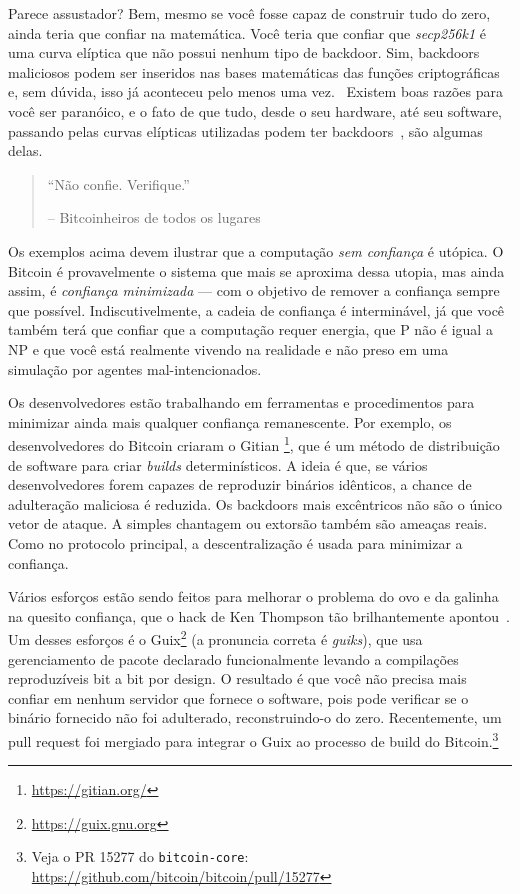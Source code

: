 Parece assustador? Bem, mesmo se você fosse capaz de construir tudo do zero, ainda teria que confiar na matemática. Você teria que confiar que \textit{secp256k1} é uma curva elíptica que não possui nenhum tipo de backdoor. Sim, backdoors maliciosos podem ser inseridos nas bases matemáticas das funções criptográficas e, sem dúvida, isso já aconteceu pelo menos uma vez.~\cite{wiki:Dual_EC_DRBG} Existem boas razões para você ser paranóico, e o fato de que tudo, desde o seu hardware, até seu software, passando pelas curvas elípticas utilizadas podem ter backdoors~\cite{wiki:backdoors}, são algumas delas.

\begin{quotation}\begin{samepage}
\enquote{Não confie. Verifique.}
\begin{flushright} -- Bitcoinheiros de todos os lugares
\end{flushright}\end{samepage}\end{quotation}

Os exemplos acima devem ilustrar que a computação \textit{sem confiança} é utópica. O Bitcoin é provavelmente o sistema que mais se aproxima dessa utopia, mas ainda assim, é \textit{confiança minimizada} --- com o objetivo de remover a confiança sempre que possível. Indiscutivelmente, a cadeia de confiança é interminável, já que você também terá que confiar que a computação requer energia, que P não é igual a NP e que você está realmente vivendo na realidade e não preso em uma simulação por agentes mal-intencionados.

Os desenvolvedores estão trabalhando em ferramentas e procedimentos para minimizar ainda mais qualquer confiança remanescente. Por exemplo, os desenvolvedores do Bitcoin criaram o Gitian \footnote{\url{https://gitian.org/}}, que é um método de distribuição de software para criar \textit{builds} determinísticos. A ideia é que, se vários desenvolvedores forem capazes de reproduzir binários idênticos, a chance de adulteração maliciosa é reduzida. Os backdoors mais excêntricos não são o único vetor de ataque. A simples chantagem ou extorsão também são ameaças reais. Como no protocolo principal, a descentralização é usada para minimizar a confiança.

Vários esforços estão sendo feitos para melhorar o problema do ovo e da galinha na quesito confiança, que o hack de Ken Thompson tão brilhantemente apontou~\cite{web:bootstrapping}. Um desses esforços é o Guix\footnote{\url{https://guix.gnu.org}} (a pronuncia correta é \textit{guiks}), que usa gerenciamento de pacote declarado funcionalmente levando a compilações reproduzíveis bit a bit por design. O resultado é que você não precisa mais confiar em nenhum servidor que fornece o software, pois pode verificar se o binário fornecido não foi adulterado, reconstruindo-o do zero. Recentemente, um pull request foi mergiado para integrar o Guix ao processo de build do Bitcoin.\footnote{Veja o PR 15277 do \texttt{bitcoin-core}: \url{https://github.com/bitcoin/bitcoin/pull/15277}}

